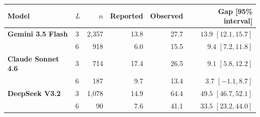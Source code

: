 \begin{tabular}{llrrrr}
\toprule
Model & $L$ & $n$ & Reported & Observed & Gap [95\% interval]\\
\midrule
\textbf{Gemini 3.5 Flash} & 3 & 2,357 & 13.8 & 27.7 & $13.9$ $[12.1, 15.7]$\\
 & 6 & 918 & 6.0 & 15.5 & $9.4$ $[7.2, 11.8]$\\
\midrule
\textbf{Claude Sonnet 4.6} & 3 & 714 & 17.4 & 26.5 & $9.1$ $[5.8, 12.2]$\\
 & 6 & 187 & 9.7 & 13.4 & $3.7$ $[-1.1, 8.7]$\\
\midrule
\textbf{DeepSeek V3.2} & 3 & 1,078 & 14.9 & 64.4 & $49.5$ $[46.7, 52.1]$\\
 & 6 & 90 & 7.6 & 41.1 & $33.5$ $[23.2, 44.0]$\\
\bottomrule
\end{tabular}
